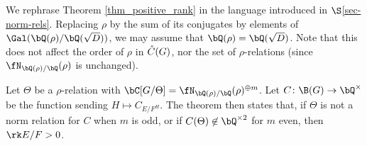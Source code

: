 \begin{rem}\label{rephrase-thm}
We rephrase Theorem \ref{thm_positive_rank} in the language introduced in $\S$\ref{sec-norm-rels}. 
Replacing $\rho$ by the sum of its conjugates by elements of $ \Gal(\bQ(\rho) / \bQ(\sqrt{D}))$, we may assume that $\bQ(\rho) = \bQ(\sqrt{D})$. Note that this does not affect the order of $\rho$ in $\hat{C}(G)$, nor the set of $\rho$-relations (since $\repnorm{\rho}$ is unchanged). 

Let $\Theta$ be a $\rho$-relation with $\bC[G / \Theta] = \repnorm{\rho}^{\oplus m}$. Let $C \colon \B(G) \to \bQ^{\times}$ be the function sending $H \mapsto C_{E / F^H}$. The theorem then states that, if $\Theta$ is not a norm relation for $C$ when $m$ is odd, or if $C(\Theta) \not\in \bQ^{\times 2}$ for $m$ even, then $ \rk E / F > 0$. 
\end{rem}







